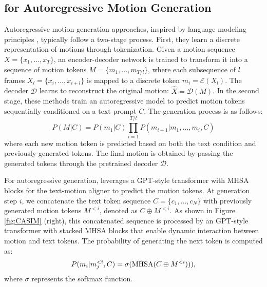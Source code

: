 \subsection{{\modulename} for Autoregressive Motion Generation}
\label{sub:autoregressive}
\vspace{-1pt}

Autoregressive motion generation approaches, inspired by language modeling principles \cite{jiang2024motiongpt, chen2024motionllm}, typically follow a two-stage process. First, they learn a discrete representation of motions through tokenization. Given a motion sequence $X=\{x_1,\dots,x_T\}$, an encoder-decoder network is trained to transform it into a sequence of motion tokens $M=\{m_1,\dots,m_{T/l}\}$, where each subsequence of $l$ frames $X_l=\{x_i,\dots,x_{i+l}\}$ is mapped to a discrete token $m_i = \mathcal{E}(X_l)$. The decoder $\mathcal{D}$ learns to reconstruct the original motion: $\hat{X}=\mathcal{D}(M)$.
In the second stage, these methods train an autoregressive model to predict motion tokens sequentially conditioned on a text prompt $C$. The generation process is as follows:
\begin{equation}
P(M|C) = P(m_1|C)\prod_{i=1}^{T/l}P(m_{i+1}|m_1,\dots,m_i,C)
\end{equation}
where each new motion token is predicted based on both the text condition and previously generated tokens. The final motion is obtained by passing the generated tokens through the pretrained decoder $\mathcal{D}$.



For autoregressive generation, {\modulename} leverages a GPT-style transformer \cite{radford2018improving, zhang2023generating} with MHSA blocks for the text-motion aligner to predict the motion tokens.
At generation step $i$, we concatenate the text token sequence $C=\{c_1,\dots,c_N\}$ with previously generated motion tokens $M^{<i}$, denoted as $C\oplus M^{<i}$. 
As shown in Figure \ref{fig:CASIM} (right), this concatenated sequence is processed by an GPT-style transformer with stacked MHSA blocks that enable dynamic interaction between motion and text tokens. 
The probability of generating the next token is computed as:
\begin{equation}
P(m_i|m_j^{<i},C)=\sigma(\operatorname{MHSA}(C \oplus M^{<i}))),
\end{equation} where $\sigma$ represents the softmax function.

